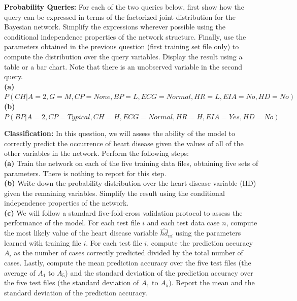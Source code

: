 \documentclass[11pt]{article}
\begin{document}
\begin{problem}{15} \textbf{Probability Queries:}
For each of the two queries below, first show how the query can be expressed in terms of the factorized joint distribution for the Bayesian network. Simplify the expressions wherever possible using the conditional independence properties of the network structure. Finally, use the parameters obtained in the previous question (first training set file only) to compute the distribution over the query variables. Display the result using a table or a bar chart. Note that there is an unobserved variable in the second query.\\

\textbf{(a)} {\footnotesize $P(CH|A=2,G=M,CP=None,BP=L,ECG=Normal,HR=L,EIA=No,HD=No)$}\\
\textbf{(b)} {\footnotesize $P(BP|A=2,CP=Typical,CH=H,ECG=Normal,HR=H,EIA=Yes,HD=No)$}

\end{problem}

\begin{problem}{20} \textbf{Classification:}
In this question, we will assess the ability of the model to correctly predict the occurrence of heart disease given the values of all of the other variables in the network. Perform the following steps:\\

\textbf{(a)} Train the network on each of the five training data files, obtaining five sets of parameters. There is nothing to report for this step. \\

\textbf{(b)} Write down the probability distribution over the heart disease variable (HD) given the remaining variables. Simplify the result using the conditional independence properties of the network. \\

\textbf{(c)} We will follow a standard five-fold-cross validation protocol to assess the performance of the model. For each test file $i$ and each test data case $n$, compute the most likely value of the heart disease variable $\hat{hd}_{ni}$ using the parameters learned with training file $i$. For each test file $i$, compute the prediction accuracy $A_i$ as the number of cases correctly predicted divided by the total number of cases. Lastly, compute the mean prediction accuracy over the five test files (the average of $A_1$ to $A_5$) and the standard deviation of the prediction accuracy over the five test files (the standard deviation of $A_1$ to $A_5$). Report the mean and the standard deviation of the prediction accuracy.
\end{problem}
\end{document}
